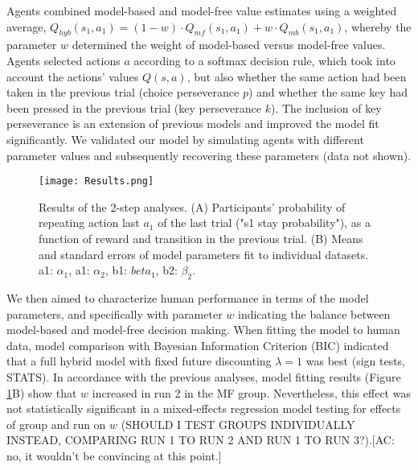 \documentclass[11pt]{article} %
\begin{document}
Agents combined model-based and model-free value estimates using a weighted average, $Q_{hyb}(s_{1}, a_{1}) = (1 - w) \cdot Q_{mf}(s_{1}, a_{1}) + w \cdot Q_{mb}(s_{1}, a_{1})$, whereby the parameter $w$ determined the weight of model-based versus model-free values. Agents selected actions $a$ according to a softmax decision rule, which took into account the actions' values $Q(s, a)$, but also whether the same action had been taken in the previous trial (choice perseverance $p$) and whether the same key had been pressed in the previous trial (key perseverance $k$). The inclusion of key perseverance is an extension of previous models and improved the model fit significantly. %
We validated our model by simulating agents with different parameter values and subsequently recovering these parameters (data not shown). %

\begin{figure}
	\texttt{[image: Results.png]}
	\caption{Results of the 2-step analyses. (A) Participants' probability of repeating action last $a_{1}$ of the last trial ("s1 stay probability"), as a function of reward and transition in the previous trial. (B) Means and standard errors of model parameters fit to individual datasets. a1: $\alpha_{1}$, a1: $\alpha_{2}$, b1: $beta_{1}$, b2: $\beta_{2}$.}
	\label{Results}
\end{figure}

We then aimed to characterize human performance in terms of the model parameters, and specifically with parameter $w$ indicating the balance between model-based and model-free decision making. When fitting the model to human data, model comparison with Bayesian Information Criterion (BIC) indicated that a full hybrid model with fixed future discounting $\lambda=1$ was best (sign tests, STATS). %
In accordance with the previous analyses, model fitting results (Figure \ref{Results}B) show that $w$ increased in run 2 in the MF group. Nevertheless, this effect was not statistically significant in a mixed-effects regression model testing for effects of group and run on $w$ (SHOULD I TEST GROUPS INDIVIDUALLY INSTEAD, COMPARING RUN 1 TO RUN 2 AND RUN 1 TO RUN 3?).[AC: no, it wouldn't be convincing at this point.]
\end{document}
